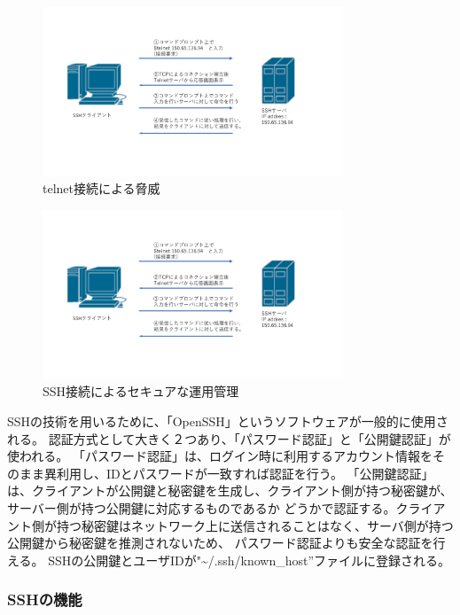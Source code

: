 \documentclass[12pt,a4paper,titlepage]{jsarticle}
\begin{document}
\begin{figure}[h]
    \centering
    \includegraphics[width=0.8\textwidth, page=3]{graphs/network_archtecture.pdf}
    \caption{telnet接続による脅威}
    \label{telnet_flow}
\end{figure}
\begin{figure}[h]
    \centering
    \includegraphics[width=0.8\textwidth, page=4]{graphs/network_archtecture.pdf}
    \caption{SSH接続によるセキュアな運用管理}
    \label{SSH_security}
\end{figure}




SSHの技術を用いるために、「OpenSSH」というソフトウェアが一般的に使用される。
認証方式として大きく２つあり、「パスワード認証」と「公開鍵認証」が使われる。
「パスワード認証」は、ログイン時に利用するアカウント情報をそのまま異利用し、IDとパスワードが一致すれば認証を行う。
「公開鍵認証」は、クライアントが公開鍵と秘密鍵を生成し、クライアント側が持つ秘密鍵が、サーバー側が持つ公開鍵に対応するものであるか
どうかで認証する。クライアント側が持つ秘密鍵はネットワーク上に送信されることはなく、サーバ側が持つ公開鍵から秘密鍵を推測されないため、
パスワード認証よりも安全な認証を行える。
SSHの公開鍵とユーザIDが"\textasciitilde/.ssh/known\_host''ファイルに登録される。
\subsubsection{SSHの機能}
\end{document}
